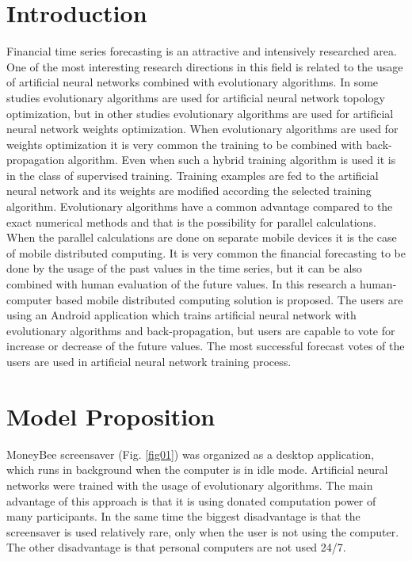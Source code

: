 \documentclass[runningheads]{llncs}
\begin{document}
\section{Introduction} \label{Introduction}

Financial time series forecasting is an attractive and intensively researched area\cite{nava01}. One of the most interesting research directions in this field is related to the usage of artificial neural networks combined with evolutionary algorithms\cite{zhang01}. In some studies evolutionary algorithms are used for artificial neural network topology optimization\cite{kapanova01}, but in other studies evolutionary algorithms are used for artificial neural network weights optimization\cite{aljarah01}. When evolutionary algorithms are used for weights optimization it is very common the training to be combined with back-propagation algorithm. Even when such a hybrid training algorithm is used it is in the class of supervised training. Training examples are fed to the artificial neural network and its weights are modified according the selected training algorithm. Evolutionary algorithms have a common advantage compared to the exact numerical methods and that is the possibility for parallel calculations\cite{altinoz01}. When the parallel calculations are done on separate mobile devices it is the case of mobile distributed computing. It is very common the financial forecasting to be done by the usage of the past values in the time series, but it can be also combined with human evaluation of the future values. In this research a human-computer based mobile distributed computing solution is proposed. The users are using an Android application which trains artificial neural network with evolutionary algorithms and back-propagation, but users are capable to vote for increase or decrease of the future values. The most successful forecast votes of the users are used in artificial neural network training process.

\section{Model Proposition} \label{Model Proposition}

MoneyBee screensaver (Fig. \ref{fig01}) was organized as a desktop application, which runs in background when the computer is in idle mode. Artificial neural networks were trained with the usage of evolutionary algorithms. The main advantage of this approach is that it is using donated computation power of many participants. In the same time the biggest disadvantage is that the screensaver is used relatively rare, only when the user is not using the computer. The other disadvantage is that personal computers are not used 24/7.
\end{document}
